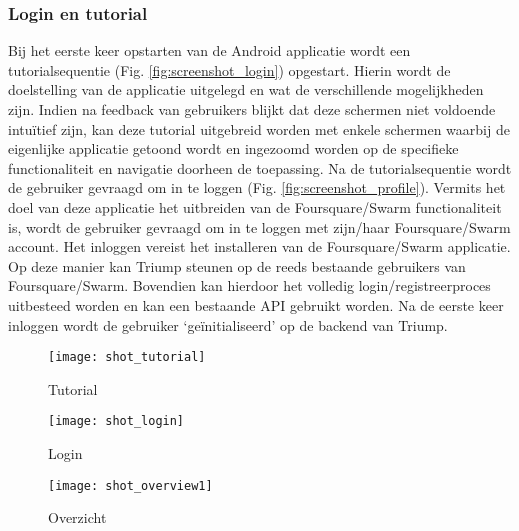 \subsubsection{Login en tutorial} %
Bij het eerste keer opstarten van de Android applicatie wordt een tutorialsequentie (Fig. \ref{fig:screenshot_login}) opgestart. Hierin wordt de doelstelling van de applicatie uitgelegd en wat de verschillende mogelijkheden zijn. Indien na feedback van gebruikers blijkt dat deze schermen niet voldoende intuïtief zijn, kan deze tutorial uitgebreid worden met enkele schermen waarbij de eigenlijke applicatie getoond wordt en ingezoomd worden op de specifieke functionaliteit en navigatie doorheen de toepassing. 
Na de tutorialsequentie wordt de gebruiker gevraagd om in te loggen (Fig. \ref{fig:screenshot_profile}). Vermits het doel van deze applicatie het uitbreiden van de Foursquare/Swarm functionaliteit is, wordt de gebruiker gevraagd om in te loggen met zijn/haar Foursquare/Swarm account. Het inloggen vereist het installeren van de Foursquare/Swarm applicatie. Op deze manier kan Triump steunen op de reeds bestaande gebruikers van Foursquare/Swarm. Bovendien kan hierdoor het volledig login/registreerproces uitbesteed worden en kan een bestaande API gebruikt worden.
Na de eerste keer inloggen wordt de gebruiker `geïnitialiseerd' op de backend van Triump.
\begin{figure}[ht]
\begin{minipage}[b]{0.18\linewidth}
	\centering
	\texttt{[image: shot\_tutorial]}
	\caption{Tutorial}
	\label{fig:screenshot_login}
\end{minipage}
\hspace{2.4cm}
\begin{minipage}[b]{0.18\linewidth}
\centering
\texttt{[image: shot\_login]}
\caption{Login}
\label{fig:screenshot_profile}
\end{minipage}
\hspace{2.4cm}
\begin{minipage}[b]{0.18\linewidth}
\centering
\texttt{[image: shot\_overview1]}
\caption{Overzicht}
\label{fig:screenshot_overview}
\end{minipage}
\end{figure}
\clearpage
